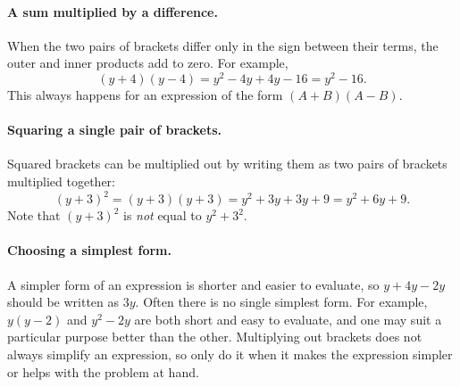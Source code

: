 

\paragraph{A sum multiplied by a difference.}
When the two pairs of brackets differ only in the sign between their terms, the outer and inner products add to zero. For example,
\[ (y + 4)(y - 4) = y^{2} - 4y + 4y - 16 = y^{2} - 16. \]
This always happens for an expression of the form $(A + B)(A - B)$.


\paragraph{Squaring a single pair of brackets.}
Squared brackets can be multiplied out by writing them as two pairs of brackets multiplied together:
\[ (y + 3)^{2} = (y + 3)(y + 3) = y^{2} + 3y + 3y + 9 = y^{2} + 6y + 9. \]
Note that $(y + 3)^{2}$ is \emph{not} equal to $y^{2} + 3^{2}$.



\paragraph{Choosing a simplest form.}
A simpler form of an expression is shorter and easier to evaluate, so $y + 4y - 2y$ should be written as $3y$. Often there is no single simplest form. For example, $y(y - 2)$ and $y^{2} - 2y$ are both short and easy to evaluate, and one may suit a particular purpose better than the other. Multiplying out brackets does not always simplify an expression, so only do it when it makes the expression simpler or helps with the problem at hand.
